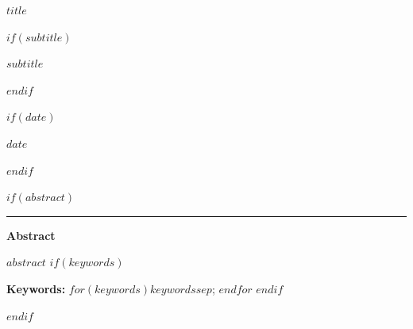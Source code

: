 \documentclass[12pt]{article}
\newif\ifhfwganon
\begin{document}
\begin{titlepage}
\thispagestyle{empty}
\vspace*{0.12\textheight}
\begin{center}
\begin{singlespace}

{\LARGE\bfseries $title$\par}

$if(subtitle)$
\vspace{0.35em}
{\large $subtitle$\par}
$endif$

\vspace{2.2em}

\hfwgauthorblock

\par\vspace{1.5\baselineskip}
\hfwgseriesblock

$if(date)$
\ifhfwganon\else
\vspace{0.35em}
{\small $date$}\par
\fi
$endif$

$if(abstract)$
\vspace{2.2\baselineskip}
\noindent\rule{0.35\textwidth}{0.4pt}\par
\vspace{0.65em}
\begin{minipage}{0.78\textwidth}
\small\singlespacing
\textbf{Abstract}\par\vspace{0.3em}
$abstract$
$if(keywords)$
\par\vspace{0.6em}
\textbf{Keywords:} $for(keywords)$$keywords$$sep$; $endfor$
$endif$
\end{minipage}
$endif$

\end{singlespace}
\end{center}
\vfill
\end{titlepage}
\else
\end{document}
